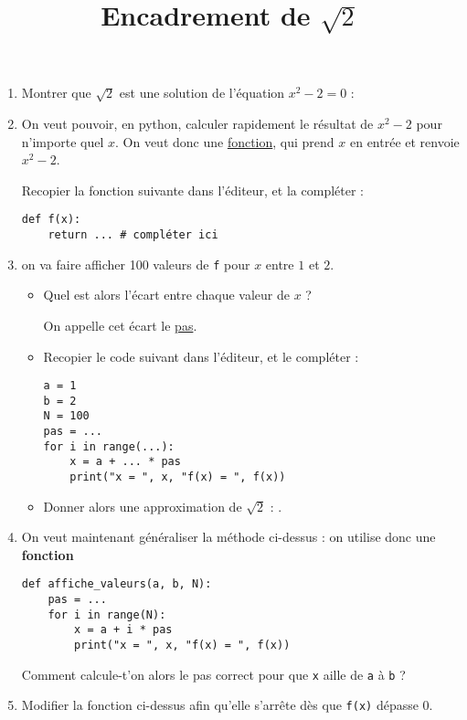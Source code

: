 \documentclass[
	classe=$1^{ere} STI2D$,
]
{informatique}
\title{Encadrement de $\sqrt{2}$}
\begin{document}
\maketitle

\begin{enumerate}
	\item Montrer que $\sqrt{2}$ est une solution de l'équation $x^2 - 2 = 0$ :

	\item On veut pouvoir, en python, calculer rapidement le résultat de $x^2 - 2$ pour n'importe quel $x$. On veut donc une \uline{fonction}, qui prend $x$ en entrée et renvoie $x^2 - 2$.

	      Recopier la fonction suivante dans l'éditeur, et la compléter :

	      \begin{lstlisting}
def f(x):
    return ... # compléter ici
	      \end{lstlisting}
	\item on va faire afficher 100 valeurs de \texttt{f} pour $x$ entre $1$ et $2$.

	      \begin{itemize}
		      \item Quel est alors l'écart entre chaque valeur de $x$ ? 

		            On appelle cet écart le \uline{pas}.
		      \item Recopier le code suivant dans l'éditeur, et le compléter :
		            \begin{lstlisting}
a = 1
b = 2
N = 100
pas = ...
for i in range(...):
	x = a + ... * pas
	print("x = ", x, "f(x) = ", f(x))
			        \end{lstlisting}
		      \item Donner alors une approximation de $\sqrt{2}$ : .
	      \end{itemize}
	\item On veut maintenant généraliser la méthode ci-dessus : on utilise donc une \textbf{fonction}
	      \begin{lstlisting}
def affiche_valeurs(a, b, N):
    pas = ...
    for i in range(N):
        x = a + i * pas
        print("x = ", x, "f(x) = ", f(x))
	      \end{lstlisting}

	      Comment calcule-t'on alors le pas correct pour que \texttt{x} aille de \texttt{a} à \texttt{b} ? 
	\item Modifier la fonction ci-dessus afin qu'elle s'arrête dès que \texttt{f(x)} dépasse 0.


\end{enumerate}
\end{document}
